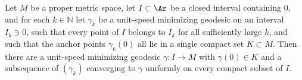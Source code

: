 \begin{lemma}
\label{lem:metric-limit-of-minimizing}
\leanok
{}
Let $M$ be a proper metric space, let $I\subset\Ar$ be a closed
interval containing $0$, and for each $k\in\mathbb{N}$ let $\gamma_k$
be a unit-speed minimizing geodesic on an interval $I_k\ni 0$, such
that every point of $I$ belongs to $I_k$ for all sufficiently large
$k$, and such that the anchor points $\gamma_k(0)$ all lie in a
single compact set $K\subset M$. Then there are a unit-speed
minimizing geodesic $\gamma\colon I\to M$ with $\gamma(0)\in K$ and a
subsequence of $(\gamma_k)$ converging to $\gamma$ uniformly on
every compact subset of $I$.
\end{lemma}

